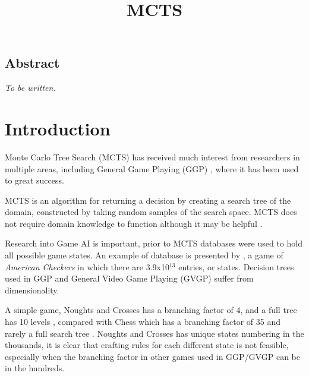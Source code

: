 \documentclass[conference]{IEEEtran}
\begin{document}
\date{}

\title{\Large\bf MCTS}

\author{
}
 
\maketitle
\thispagestyle{empty}

\subsection*{\centering Abstract}
{\em
To be written.  
}

\section{Introduction}
Monte Carlo Tree Search (MCTS) has received much interest from researchers in multiple areas, including General Game Playing (GGP) \cite{b1},  where it has been used to great success.

MCTS is an algorithm for returning a decision by creating a search tree of the domain, constructed by taking random samples of the search space. MCTS does not require domain knowledge to function although it may be helpful \cite{b2}.

Research into Game AI is important, prior to MCTS databases were used to hold all possible game states. An example of database is presented by \cite{b4}, a game of {\em American Checkers} in which there are 3.9x10$^{13}$ entries, or states. Decision trees used in GGP and General Video Game Playing (GVGP) suffer from dimensionality. 

A simple game, Noughts and Crosses has a branching factor of 4, and a full tree has 10 levels \cite{bartle}, compared with Chess which has a branching factor of 35 and rarely a full search tree \cite{bartle}. Noughts and Crosses has unique states numbering in the thousands, it is clear that crafting rules for each different state is not feasible, especially when the branching factor in other games used in GGP/GVGP can be in the hundreds. 
\end{document}
